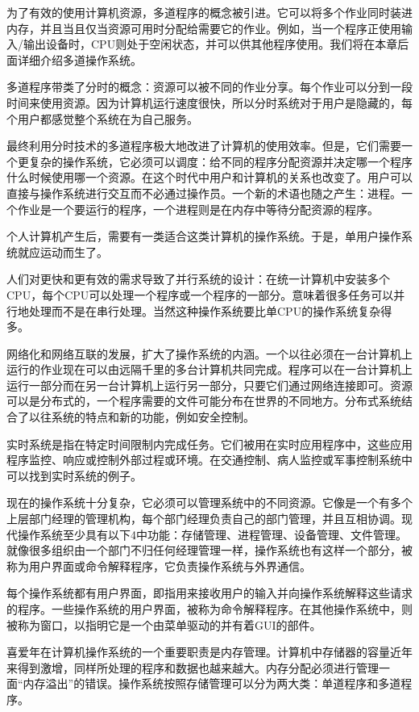 为了有效的使用计算机资源，多道程序的概念被引进。它可以将多个作业同时装进内存，并且当且仅当资源可用时分配给需要它的作业。例如，当一个程序正使用输入/输出设备时，CPU则处于空闲状态，并可以供其他程序使用。我们将在本章后面详细介绍多道操作系统。

多道程序带类了分时的概念：资源可以被不同的作业分享。每个作业可以分到一段时间来使用资源。因为计算机运行速度很快，所以分时系统对于用户是隐藏的，每个用户都感觉整个系统在为自己服务。

最终利用分时技术的多道程序极大地改进了计算机的使用效率。但是，它们需要一个更复杂的操作系统，它必须可以调度：给不同的程序分配资源并决定哪一个程序什么时候使用哪一个资源。在这个时代中用户和计算机的关系也改变了。用户可以直接与操作系统进行交互而不必通过操作员。一个新的术语也随之产生：进程。一个作业是一个要运行的程序，一个进程则是在内存中等待分配资源的程序。

个人计算机产生后，需要有一类适合这类计算机的操作系统。于是，单用户操作系统就应运动而生了。

人们对更快和更有效的需求导致了并行系统的设计：在统一计算机中安装多个CPU，每个CPU可以处理一个程序或一个程序的一部分。意味着很多任务可以并行地处理而不是在串行处理。当然这种操作系统要比单CPU的操作系统复杂得多。

网络化和网络互联的发展，扩大了操作系统的内涵。一个以往必须在一台计算机上运行的作业现在可以由远隔千里的多台计算机共同完成。程序可以在一台计算机上运行一部分而在另一台计算机上运行另一部分，只要它们通过网络连接即可。资源可以是分布式的，一个程序需要的文件可能分布在世界的不同地方。分布式系统结合了以往系统的特点和新的功能，例如安全控制。

实时系统是指在特定时间限制内完成任务。它们被用在实时应用程序中，这些应用程序监控、响应或控制外部过程或环境。在交通控制、病人监控或军事控制系统中可以找到实时系统的例子。

现在的操作系统十分复杂，它必须可以管理系统中的不同资源。它像是一个有多个上层部门经理的管理机构，每个部门经理负责自己的部门管理，并且互相协调。现代操作系统至少具有以下4中功能：存储管理、进程管理、设备管理、文件管理。就像很多组织由一个部门不归任何经理管理一样，操作系统也有这样一个部分，被称为用户界面或命令解释程序，它负责操作系统与外界通信。

每个操作系统都有用户界面，即指用来接收用户的输入并向操作系统解释这些请求的程序。一些操作系统的用户界面，被称为命令解释程序。在其他操作系统中，则被称为窗口，以指明它是一个由菜单驱动的并有着GUI的部件。

喜爱年在计算机操作系统的一个重要职责是内存管理。计算机中存储器的容量近年来得到激增，同样所处理的程序和数据也越来越大。内存分配必须进行管理一面“内存溢出”的错误。操作系统按照存储管理可以分为两大类：单道程序和多道程序。

